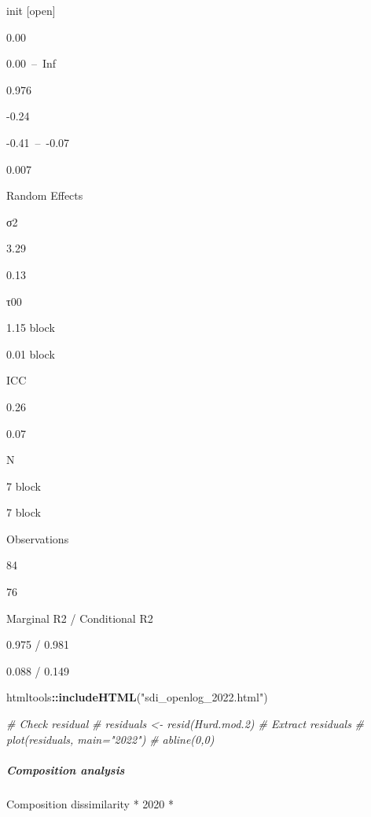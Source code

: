 \documentclass[
]{article}
\newenvironment{Shaded}{\begin{snugshade}}{\end{snugshade}}
\newcommand{\CommentTok}[1]{\textcolor[rgb]{0.56,0.35,0.01}{\textit{#1}}}
\newcommand{\FunctionTok}[1]{\textcolor[rgb]{0.13,0.29,0.53}{\textbf{#1}}}
\newcommand{\NormalTok}[1]{#1}
\newcommand{\SpecialCharTok}[1]{\textcolor[rgb]{0.81,0.36,0.00}{\textbf{#1}}}
\newcommand{\StringTok}[1]{\textcolor[rgb]{0.31,0.60,0.02}{#1}}
\begin{document}
init {[}open{]}

0.00

0.00~--~Inf

0.976

-0.24

-0.41~--~-0.07

0.007

Random Effects

σ2

3.29

0.13

τ00

1.15 block

0.01 block

ICC

0.26

0.07

N

7 block

7 block

Observations

84

76

Marginal R2 / Conditional R2

0.975 / 0.981

0.088 / 0.149

\begin{Shaded}
\begin{Highlighting}[]
\NormalTok{htmltools}\SpecialCharTok{::}\FunctionTok{includeHTML}\NormalTok{(}\StringTok{"sdi\_openlog\_2022.html"}\NormalTok{)}
\end{Highlighting}
\end{Shaded}

\begin{Shaded}
\begin{Highlighting}[]
\CommentTok{\# Check residual}
\CommentTok{\# residuals \textless{}{-} resid(Hurd.mod.2) \# Extract residuals}
\CommentTok{\# plot(residuals, main="2022")}
\CommentTok{\# abline(0,0)}
\end{Highlighting}
\end{Shaded}

\hypertarget{composition-analysis}{%
\subparagraph{Composition analysis}\label{composition-analysis}}

Composition dissimilarity * 2020 *
\end{document}
